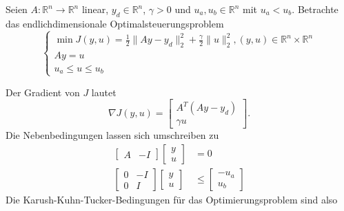 
Seien $A: \mathbb R^n\to \mathbb R^n$ linear, $y_d\in\mathbb R^n$, $\gamma>0$ und $u_a,u_b\in\mathbb R^n$ mit $u_a<u_b$. Betrachte das endlichdimensionale Optimalsteuerungsproblem
$$\begin{cases}\min J(y,u)=\frac{1}{2}\|Ay-y_d\|_2^2+\frac{\gamma}{2}\|u\|_2^2, (y,u)\in\mathbb R^n\times \mathbb R^n\\Ay=u\\u_a\leq u\leq u_b\end{cases}$$
\begin{compactenum}[(i)]
\item 
Der Gradient von $J$ lautet $$\nabla J(y,u)=\begin{bmatrix}A^T(Ay-y_d)\\\gamma u\end{bmatrix}.$$
Die Nebenbedingungen lassen sich umschreiben zu
\begin{align*}\begin{bmatrix}A&-I\end{bmatrix}\begin{bmatrix}y\\u\end{bmatrix}&=0\\
\begin{bmatrix}0&-I\\0&I\end{bmatrix}\begin{bmatrix}y\\u\end{bmatrix}&\leq \begin{bmatrix}-u_a\\u_b\end{bmatrix}
\end{align*}
Die Karush-Kuhn-Tucker-Bedingungen für das Optimierungsproblem sind also
\begin{align*}

\end{align*}
\end{compactenum}
